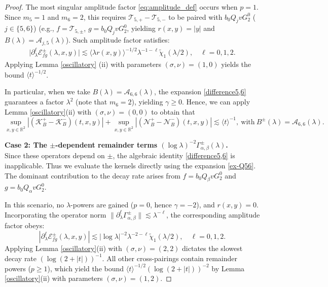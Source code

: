 \documentclass[reqno]{amsart}
\numberwithin{equation}{section}
\begin{document}
\begin{proof}
	The most singular amplitude factor \eqref{eq:amplitude_def} occurs  when $p=1$. Since $m_5=1$ and $m_6=2$, this requires $\mathcal{T}_{5,+}-\mathcal{T}_{5,-}$ to be paired with $b_0 Q_j v G_2^0$  ($j\in\{5,6\}$)  (e.g., $f = \mathcal{T}_{5,\pm}$, $g = b_0 Q_j v G_2^0$, yielding $r(x,y) = |y|$ and $B(\lambda)=\mathcal{A}_{j,5}(\lambda)$). Such amplitude factor satisfies:  
	\begin{align*}   
	\bigl|\partial_\lambda^{\ell} \mathcal{E}_{fg}^\pm(\lambda,x,y) \bigr| \lesssim \langle \lambda r(x,y)\rangle^{-1/2} \lambda^{-1-\ell} \widetilde{\chi}_1 (\lambda/2), \quad \ell=0,1,2.      
	\end{align*}    
	Applying Lemma \ref{oscillatory} (ii) with parameters $(\sigma,\nu)=(1,0)$  yields the bound $\langle t\rangle^{-1/2}$.   
	
	In particular, when we take $B(\lambda)=\mathcal{A}_{6,6}(\lambda)$, the expansion \eqref{difference5,6} guarantees a factor $\lambda^2$ (note that $m_6=2$), yielding $\gamma \ge 0.$ Hence, we can apply Lemma \ref{oscillatory}(ii) with  $(\sigma,\nu)=(0,0)$  to obtain that 
	\begin{equation}\label{mathcalA66}
	\sup _{x, y \in \mathbb{R}^2}\left|\left(\mathcal{K}_{B}^+-\mathcal{K}_{B}^-\right)(t,x,y)\right| +      
	\sup _{x, y \in \mathbb{R}^2}\left|\left(\mathcal{N}_{B}^+-\mathcal{N}_{B}^-\right)(t,x,y)\right|  \lesssim \langle t\rangle^{-1}, \ \text{with} \ B^\pm(\lambda)=\mathcal{A}_{6,6}(\lambda).
	\end{equation}
	
	\vspace{1.5mm}      
	\textbf{Case 2: The $\pm$-dependent remainder terms $(\log\lambda)^{-2}\Gamma_{\alpha,\beta}^\pm(\lambda)$.} \\  
	Since these operators depend on $\pm$, the algebraic identity \eqref{difference5,6} is inapplicable.  Thus we evaluate the kernels directly using the expansion \eqref{ex-Q56}. The dominant contribution to the decay rate arises from $f = b_0 Q_\beta v G_2^0$ and $g = b_0 Q_\alpha v G_2^0$.  
	
	In this scenario, no $\lambda$-powers are gained ($p=0$, hence $\gamma = -2$), and  $r(x,y)=0$. Incorporating the operator norm $\|\partial_\lambda^\ell \Gamma_{\alpha,\beta}^\pm\| \lesssim \lambda^{-\ell}$, the corresponding  amplitude factor obeys:  
	\[    
	|\partial_\lambda^\ell \mathcal{E}_{fg}^\pm(\lambda, x, y)| \lesssim |\log\lambda|^{-2}\lambda^{-2-\ell} \widetilde{\chi}_1(\lambda/2), \quad \ell=0,1,2.    
	\]    
	Applying Lemma \ref{oscillatory}(ii) with  $(\sigma,\nu)=(2,2)$  dictates the slowest  decay rate $(\log(2+|t|))^{-1}$. All other cross-pairings contain remainder powers ($p \ge 1$), which yield the bound $\langle t \rangle^{-1/2} (\log(2+|t|))^{-2}$ by  Lemma \ref{oscillatory}(ii) with parameters $(\sigma,\nu)=(1,2).$   
	

\end{proof}
\end{document}
